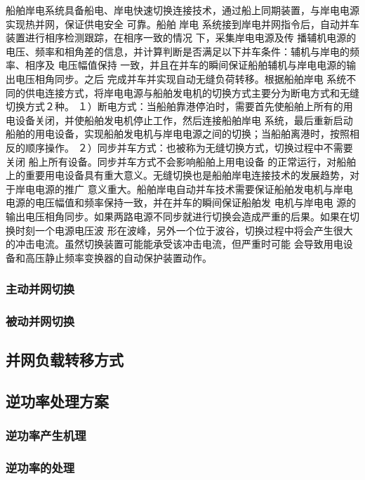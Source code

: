 船舶岸电系统具备船电、岸电快速切换连接技术，通过船上同期装置，与岸电电源实现热并网，保证供电安全
可靠。船舶 岸电 系统接到岸电并网指令后，自动并车装置进行相序检测跟踪，在相序一致的情况 下，采集岸电电源及传
播辅机电源的电压、频率和相角差的信息，并计算判断是否满足以下并车条件：辅机与岸电的频率、相序及 电压幅值保持
一致，并且在并车的瞬间保证船舶辅机与岸电电源的输出电压相角同步。之后 完成并车并实现自动无缝负荷转移。根据船舶岸电
系统不同的供电连接方式，将岸电电源与船舶发电机的切换方式主要分为断电方式和无缝切换方式２种\cite{SP10}。
１）断电方式：当船舶靠港停泊时，需要首先使船舶上所有的用电设备关闭，并使船舶发电机停止工作，然后连接船舶岸电
系统，最后重新启动船舶的用电设备，实现船舶发电机与岸电电源之间的切换；当船舶离港时，按照相反的顺序操作。
２）同步并车方式：也被称为无缝切换方式，切换过程中不需要关闭 船上所有设备。同步并车方式不会影响船舶上用电设备
的正常运行，对船舶上的重要用电设备具有重大意义。无缝切换也是船舶岸电连接技术的发展趋势，对于岸电电源的推广
意义重大。船舶岸电自动并车技术需要保证船舶发电机与岸电电源的电压幅值和频率保持一致，并在并车的瞬间保证船舶发
电机与岸电电 源的输出电压相角同步。如果两路电源不同步就进行切换会造成严重的后果。如果在切换时刻一个电源电压波
形在波峰，另外一个位于波谷，切换过程中将会产生很大的冲击电流。虽然切换装置可能能承受该冲击电流，但严重时可能
会导致用电设备和高压静止频率变换器的自动保护装置动作。



\subsubsection{主动并网切换}
\subsubsection{被动并网切换}

\subsection{并网负载转移方式}
\subsection{逆功率处理方案}
\subsubsection{逆功率产生机理}
\subsubsection{逆功率的处理}
